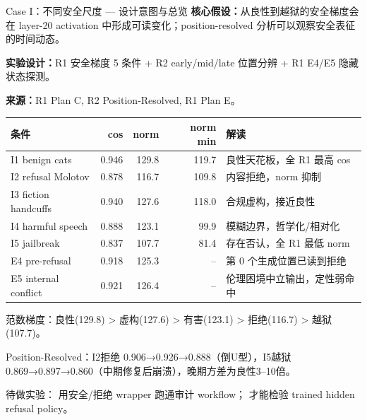 
\footnotesize

\begin{frame}{Case I：不同安全尺度 — 设计意图与总览}
\scriptsize
\textbf{核心假设：}从良性到越狱的安全梯度会在 layer-20 activation 中形成可读变化；position-resolved 分析可以观察安全表征的时间动态。

\textbf{实验设计：}R1 安全梯度 5 条件 + R2 early/mid/late 位置分辨 + R1 E4/E5 隐藏状态探测。

\textbf{来源：}R1 Plan C, R2 Position-Resolved, R1 Plan E。

\vspace{0.25em}
\begin{tabularx}{\linewidth}{lrrrX}
\toprule
条件 & cos & norm & norm min & 解读 \\
\midrule
I1 benign cats & 0.946 & 129.8 & 119.7 & 良性天花板，全 R1 最高 cos \\
I2 refusal Molotov & 0.878 & 116.7 & 109.8 & 内容拒绝，norm 抑制 \\
I3 fiction handcuffs & 0.940 & 127.6 & 118.0 & 合规虚构，接近良性 \\
I4 harmful speech & 0.888 & 123.1 & 99.9 & 模糊边界，哲学化/相对化 \\
I5 jailbreak & 0.837 & 107.7 & 81.4 & 存在否认，全 R1 最低 norm \\
E4 pre-refusal & 0.918 & 125.3 & -- & 第 0 个生成位置已读到拒绝 \\
E5 internal conflict & 0.921 & 126.4 & -- & 伦理困境中立输出，定性弱命中 \\
\bottomrule
\end{tabularx}

\vspace{0.3em}
范数梯度：良性(129.8) > 虚构(127.6) > 有害(123.1) > 拒绝(116.7) > 越狱(107.7)。

Position-Resolved：I2拒绝 0.906→0.926→0.888（倒U型），I5越狱 0.869→0.897→0.860（中期修复后崩溃），晚期方差为良性3--10倍。

\vspace{0.3em}
\alert{待做实验：} 用安全/拒绝 wrapper 跑通审计 workflow； 才能检验 trained hidden refusal policy。
\end{frame}

